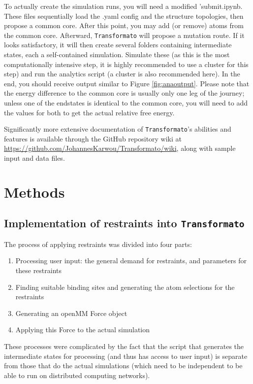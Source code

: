 \documentclass[oneside]{scrreprt}
\begin{document}
To actually create the simulation runs, you will need a modified 'submit.ipynb. These files sequentially load the .yaml config and the structure topologies, then propose a common core. After this point, you may add (or remove) atoms from the common core. Afterward, \texttt{Transformato} will propose a mutation route. If it looks satisfactory, it will then create several folders containing intermediate states, each a self-contained simulation. Simulate these (as this is the most computationally intensive step, it is highly recommended to use a cluster for this step) and run the analytics script (a cluster is also recommended here). In the end, you should receive output similar to Figure \ref{fig:anaoutput}. Please note that the energy difference to the common core is usually only one leg of the journey; unless one of the endstates is identical to the common core, you will need to add the values for both to get the actual relative free energy. 

Significantly more extensive documentation of \texttt{Transformato}'s abilities and features is available through the GitHub repository wiki at \url{https://github.com/JohannesKarwou/Transformato/wiki}, along with sample input and data files.


\chapter{Methods}
\section{Implementation of restraints into \texttt{Transformato}}

The process of applying restraints was divided into four parts:

\begin{enumerate}
    \item Processing user input: the general demand for restraints, and parameters for these restraints
    \item Finding suitable binding sites and generating the atom selections for the restraints
    \item Generating an openMM Force object
    \item Applying this Force to the actual simulation

\end{enumerate}

These processes were complicated by the fact that the script that generates the intermediate states for processing (and thus has access to user input) is separate from those that do the actual simulations (which need to be independent to be able to run on distributed computing networks).
\end{document}
